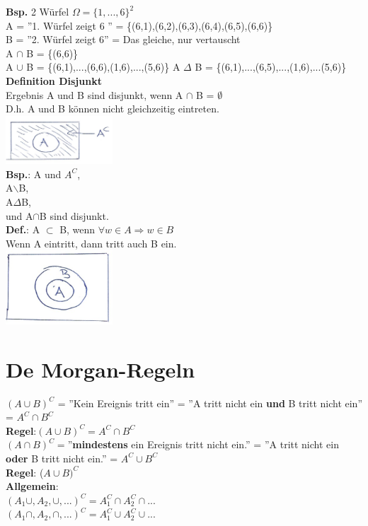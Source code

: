 \textbf{Bsp.} 2 Würfel $\Omega = \{1,...,6\}^2$\\
A = ''1. Würfel zeigt 6 '' = \{(6,1),(6,2),(6,3),(6,4),(6,5),(6,6)\}\\
B = ''2. Würfel zeigt 6'' = Das gleiche, nur vertauscht\medskip\\
A $\cap$ B = \{(6,6)\}\\
A $\cup$ B = \{(6,1),...,(6,6),(1,6),...,(5,6)\}
A $\Delta$ B = \{(6,1),...,(6,5),...,(1,6),...(5,6)\}\newpage
\textbf{Definition Disjunkt}\\
Ergebnis A und B sind disjunkt, wenn A $\cap$ B = $\emptyset$\\D.h. A und B können nicht gleichzeitig eintreten.\\\includegraphics[width=0.3\textwidth]{img/komplement.PNG}\medskip\\
\textbf{Bsp.}: A und $A^C$,\\ A$\backslash$B,\\ A$\Delta$B,\\ und A$\cap$B sind disjunkt.\medskip\\
\textbf{Def.}: A $\subset$ B, wenn $\forall w \in A \Rightarrow w \in B$\\Wenn A eintritt, dann tritt auch B ein.\\\includegraphics[width=0.3\textwidth]{img/subset.PNG}\medskip\\
\section{De Morgan-Regeln}
$\left( A \cup B\right)^C$ = ''Kein Ereignis tritt ein'' = ''A tritt nicht ein \textbf{und} B tritt nicht ein'' = $A^C \cap B^C$\\
\textbf{Regel}:$(A\cup B)^C = A^C \cap B^C$\medskip\\
$(A \cap B)^C =$''\textbf{mindestens} ein Ereignis tritt nicht ein.'' = ''A tritt nicht ein \textbf{oder} B tritt nicht ein.'' = $A^C\cup B^C$\medskip\\
\textbf{Regel}: ($A\cup B)^C$\\
\textbf{Allgemein}: \\$(A_1\cup,A_2,\cup,...)^C = A_1^C\cap A_2^C\cap...$\\
$(A_1\cap,A_2,\cap,...)^C = A_1^C\cup A_2^C\cup...$
